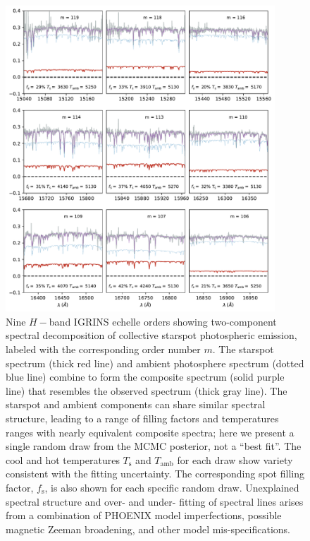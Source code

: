 \documentclass[trackchanges]{aastex631}
\begin{document}
\begin{figure}[ht]
 \centering
 \includegraphics[width=0.90\textwidth]{figures/H_band_spectra_3x3.pdf}
 \caption{Nine $H-$band IGRINS echelle orders showing two-component spectral decomposition of collective starspot photospheric emission, labeled with the corresponding order number $m$.  The starspot spectrum (thick red line) and ambient photosphere spectrum (dotted blue line) combine to form the composite spectrum (solid purple line) that resembles the observed spectrum (thick gray line).  The starspot and ambient components can share similar spectral structure, leading to a range of filling factors and temperatures ranges with nearly equivalent composite spectra; here we present a single random draw from the MCMC posterior, not a ``best fit''.  The cool and hot temperatures $T_{\textrm{s}}$ and $T_{\textrm{amb}}$ for each draw show variety consistent with the fitting uncertainty. The corresponding spot filling factor, $f_{\textrm{s}}$, is also shown for each specific random draw. Unexplained spectral structure and over- and under- fitting of spectral lines arises from a combination of PHOENIX model imperfections, possible magnetic Zeeman broadening, and other model mis-specifications.}
 \label{fig:IGRINS_spectra3x3}
\end{figure}
\end{document}
